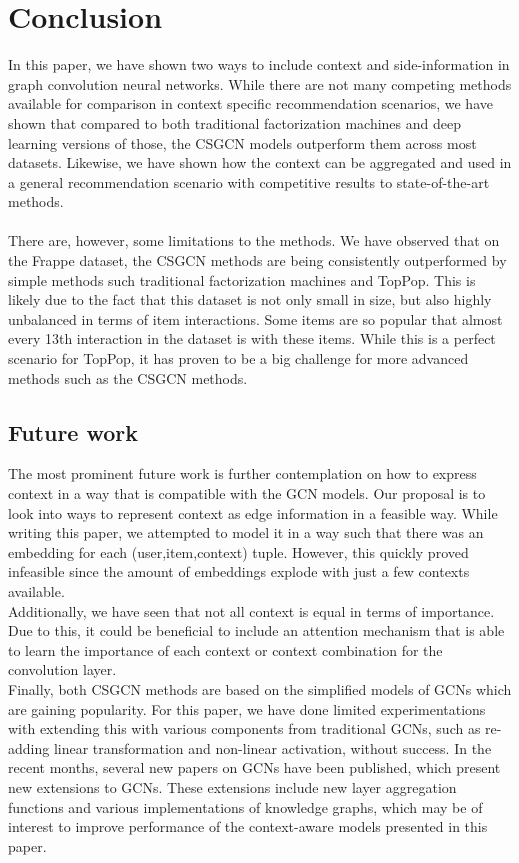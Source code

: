 \section{Conclusion}\label{sec:conclusion}
In this paper, we have shown two ways to include context and side-information in graph convolution neural networks.
While there are not many competing methods available for comparison in context specific recommendation scenarios, we have shown that compared to both traditional factorization machines and deep learning versions of those, the CSGCN models outperform them across most datasets.
Likewise, we have shown how the context can be aggregated and used in a general recommendation scenario with competitive results to state-of-the-art methods.
\\\\
There are, however, some limitations to the methods.
We have observed that on the Frappe dataset, the CSGCN methods are being consistently outperformed by simple methods such traditional factorization machines and TopPop.
This is likely due to the fact that this dataset is not only small in size, but also highly unbalanced in terms of item interactions.
Some items are so popular that almost every 13th interaction in the dataset is with these items.
While this is a perfect scenario for TopPop, it has proven to be a big challenge for more advanced methods such as the CSGCN methods.

\subsection{Future work}
The most prominent future work is further contemplation on how to express context in a way that is compatible with the GCN models.
Our proposal is to look into ways to represent context as edge information in a feasible way.
While writing this paper, we attempted to model it in a way such that there was an embedding for each (user,item,context) tuple.
However, this quickly proved infeasible since the amount of embeddings explode with just a few contexts available.
\\
Additionally, we have seen that not all context is equal in terms of importance.
Due to this, it could be beneficial to include an attention mechanism that is able to learn the importance of each context or context combination for the convolution layer.
\\
Finally, both CSGCN methods are based on the simplified models of GCNs which are gaining popularity.
For this paper, we have done limited experimentations with extending this with various components from traditional GCNs, such as re-adding linear transformation and non-linear activation, without success.
In the recent months, several new papers on GCNs have been published, which present new extensions to GCNs.
These extensions include new layer aggregation functions and various implementations of knowledge graphs, which may be of interest to improve performance of the context-aware models presented in this paper.